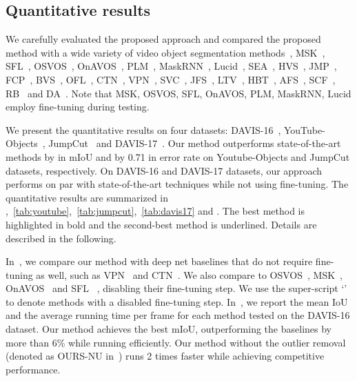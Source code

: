 \subsection{Quantitative results}

We carefully evaluated the proposed approach and compared the proposed method with a wide variety of video object segmentation methods~\ie, MSK~\cite{PerazziCVPR17}, SFL~\cite{ChenICCV17}, OSVOS~\cite{caelles2016one}, OnAVOS~\cite{voigtlaender2017online}, PLM~\cite{yoon2017pixel}, MaskRNN~\cite{hu2017maskrnn}, Lucid~\cite{khoreva2017lucid}, SEA~\cite{AvinashCVPR14}, HVS~\cite{GrundmannCVPR2010}, JMP~\cite{FanTOG15}, FCP~\cite{PerazziICCV15}, BVS~\cite{MaerkiCVPR16}, OFL~\cite{TsaiCVPR2016}, CTN~\cite{JangCVPR17}, VPN~\cite{JampaniCVPR17}, 
SVC~\cite{WangTIP2017}, JFS~\cite{NagarajaICCV15}, LTV~\cite{OchsPAMI2014}, HBT~\cite{GodecICCV2011}, AFS~\cite{VijayanarasimhanECCV2012}, SCF~\cite{JainECCV2014}, RB~\cite{BaiSIGGRAPH2009} and DA~\cite{ZhongTOG12}. Note that MSK, OSVOS, SFL, OnAVOS, PLM, MaskRNN, Lucid employ fine-tuning during testing.

We present the quantitative results on four datasets: DAVIS-16~\cite{PerazziCVPR16}, YouTube-Objects~\cite{PrestCVPR12}, JumpCut~\cite{FanTOG15} and DAVIS-17~\cite{pont2017DAVIS}. Our method outperforms state-of-the-art methods by  in mIoU and by 0.71 in error rate on Youtube-Objects and JumpCut datasets, respectively. On DAVIS-16 and DAVIS-17 datasets, our approach performs on par with state-of-the-art techniques while not using fine-tuning. The quantitative results are summarized in ,~\ref{tab:youtube},~\ref{tab:jumpcut},~\ref{tab:davis17} and . The best method is highlighted in bold and the second-best method is underlined. Details are described in the following.

In~, we compare our method with deep net baselines that do not require fine-tuning as well, such as VPN~\cite{JampaniCVPR17} and CTN~\cite{JangCVPR17}. We also compare to OSVOS~\cite{caelles2016one}, MSK~\cite{PerazziCVPR17}, OnAVOS~\cite{voigtlaender2017online} and SFL ~\cite{ChenICCV17}, disabling their fine-tuning step. We use the super-script `' to denote methods with a disabled fine-tuning step. In~, we report the mean IoU and the average running time per frame for each method tested on the DAVIS-16 dataset. Our method achieves the best mIoU, outperforming the baselines by more than 6\% while running efficiently. Our method without the outlier removal (denoted as OURS-NU in~) runs 2 times faster while achieving competitive performance.

